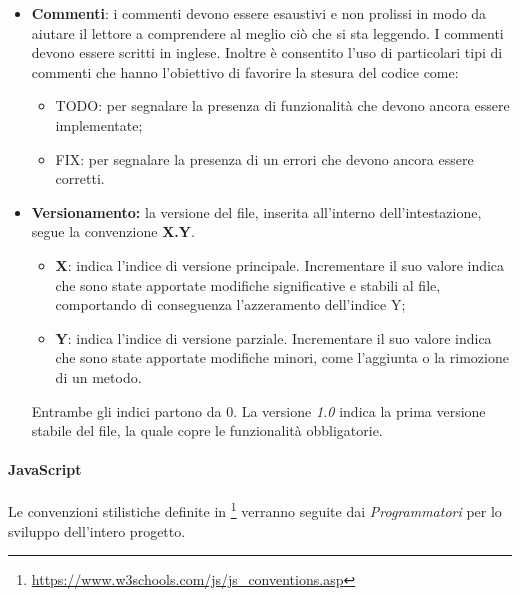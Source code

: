 \begin{itemize}
	\item \textbf{Commenti}: i commenti devono essere esaustivi e non prolissi in modo da aiutare il lettore a comprendere al meglio ciò che si sta leggendo. I commenti devono essere scritti in inglese. Inoltre è consentito l'uso di particolari tipi di commenti che hanno l'obiettivo di favorire la stesura del codice come:
	\begin{itemize}
		\item TODO: per segnalare la presenza di funzionalità che devono ancora essere implementate;
		\item FIX: per segnalare la presenza di un errori che devono ancora essere corretti.
	\end{itemize}

	\item \textbf{Versionamento:} la versione del file, inserita all'interno dell'intestazione, segue la convenzione \textbf{X.Y}.
	\begin{itemize}
		\item{\textbf{X}: indica l'indice di versione principale. Incrementare il suo valore indica che sono state apportate modifiche significative e stabili al file, comportando di conseguenza l'azzeramento dell'indice Y;}
		\item{\textbf{Y}: indica l'indice di versione parziale. Incrementare il suo valore indica che sono state apportate modifiche minori, come l'aggiunta o la rimozione di un metodo.}
	\end{itemize}
	Entrambe gli indici partono da 0. La versione \emph{1.0} indica la prima versione stabile del file, la quale copre le funzionalità obbligatorie.
\end{itemize}

\paragraph{JavaScript}\Spazio
Le convenzioni stilistiche definite in \footnote{\url{https://www.w3schools.com/js/js_conventions.asp}} verranno seguite dai \emph{Programmatori} per lo sviluppo dell'intero progetto.

